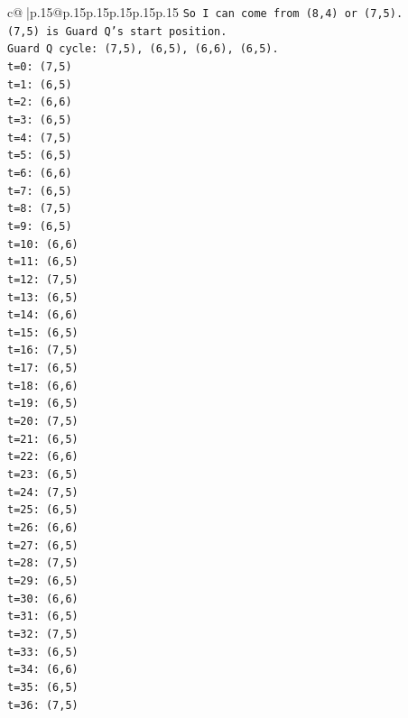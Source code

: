 \documentclass{article}
\begin{document}
{\begin{supertabular}{c@{$\;$}|p{.15\linewidth}@{}p{.15\linewidth}p{.15\linewidth}p{.15\linewidth}p{.15\linewidth}p{.15\linewidth}}
{{{\texttt{So I can come from (8,4) or (7,5).} \\
\texttt{(7,5) is Guard Q's start position.} \\
\texttt{Guard Q cycle: (7,5), (6,5), (6,6), (6,5).} \\
\texttt{t=0: (7,5)} \\
\texttt{t=1: (6,5)} \\
\texttt{t=2: (6,6)} \\
\texttt{t=3: (6,5)} \\
\texttt{t=4: (7,5)} \\
\texttt{t=5: (6,5)} \\
\texttt{t=6: (6,6)} \\
\texttt{t=7: (6,5)} \\
\texttt{t=8: (7,5)} \\
\texttt{t=9: (6,5)} \\
\texttt{t=10: (6,6)} \\
\texttt{t=11: (6,5)} \\
\texttt{t=12: (7,5)} \\
\texttt{t=13: (6,5)} \\
\texttt{t=14: (6,6)} \\
\texttt{t=15: (6,5)} \\
\texttt{t=16: (7,5)} \\
\texttt{t=17: (6,5)} \\
\texttt{t=18: (6,6)} \\
\texttt{t=19: (6,5)} \\
\texttt{t=20: (7,5)} \\
\texttt{t=21: (6,5)} \\
\texttt{t=22: (6,6)} \\
\texttt{t=23: (6,5)} \\
\texttt{t=24: (7,5)} \\
\texttt{t=25: (6,5)} \\
\texttt{t=26: (6,6)} \\
\texttt{t=27: (6,5)} \\
\texttt{t=28: (7,5)} \\
\texttt{t=29: (6,5)} \\
\texttt{t=30: (6,6)} \\
\texttt{t=31: (6,5)} \\
\texttt{t=32: (7,5)} \\
\texttt{t=33: (6,5)} \\
\texttt{t=34: (6,6)} \\
\texttt{t=35: (6,5)} \\
\texttt{t=36: (7,5)} \\
}}}
\end{supertabular}}
\end{document}
